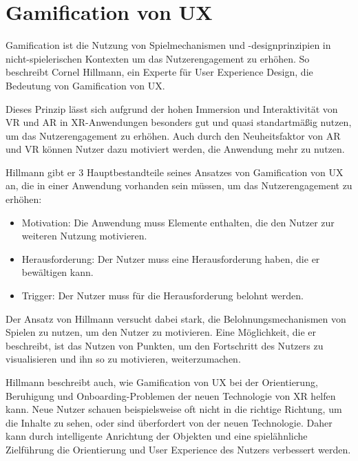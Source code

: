   
\section{Gamification von UX}
\label{sec:gamification-ux}

\glqq{}Gamification ist die Nutzung von Spielmechanismen und -designprinzipien in nicht-spielerischen Kontexten um das Nutzerengagement zu erhöhen.\grqq{} \autocite[][S.63]{hillmann2021ux} 
So beschreibt Cornel Hillmann, ein Experte für User Experience Design, die Bedeutung von Gamification von UX.

Dieses Prinzip lässt sich aufgrund der hohen Immersion und Interaktivität von VR und AR in XR-Anwendungen besonders gut und quasi standartmäßig nutzen, um das Nutzerengagement zu erhöhen.
Auch durch den Neuheitsfaktor von AR und VR können Nutzer dazu motiviert werden, die Anwendung mehr zu nutzen.

Hillmann gibt er 3 Hauptbestandteile seines Ansatzes von Gamification von UX an, die in einer Anwendung vorhanden sein müssen, um das Nutzerengagement zu erhöhen:
\begin{itemize}
  \item Motivation: Die Anwendung muss Elemente enthalten, die den Nutzer zur weiteren Nutzung motivieren.
  \item Herausforderung: Der Nutzer muss eine Herausforderung haben, die er bewältigen kann.
  \item Trigger: Der Nutzer muss für die Herausforderung belohnt werden.
\end{itemize}
\autocite[S.66]{hillmann2021ux}

Der Ansatz von Hillmann versucht dabei stark, die Belohnungsmechanismen von Spielen zu nutzen, um den Nutzer zu motivieren.
Eine Möglichkeit, die er beschreibt, ist das Nutzen von Punkten, um den Fortschritt des Nutzers zu visualisieren und ihn so zu motivieren, weiterzumachen.

Hillmann beschreibt auch, wie Gamification von UX bei der Orientierung, Beruhigung und Onboarding-Problemen der neuen Technologie von XR helfen kann.
Neue Nutzer schauen beispielsweise oft nicht in die richtige Richtung, um die Inhalte zu sehen, oder sind überfordert von der neuen Technologie.
Daher kann durch intelligente Anrichtung der Objekten und eine spielähnliche Zielführung die Orientierung und User Experience des Nutzers verbessert werden\autocite[S.67]{hillmann2021ux}.